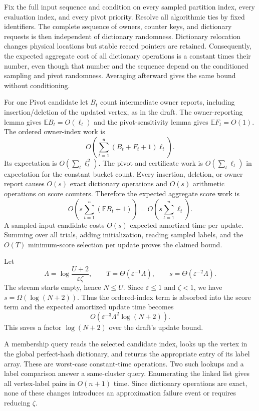 \documentclass[11pt]{article}
\begin{document}
Fix the full input sequence and condition on every sampled partition
index, every evaluation index, and every pivot priority. Resolve all
algorithmic ties by fixed identifiers. The complete sequence of owners,
counter keys, and dictionary requests is then independent of dictionary
randomness. Dictionary relocation changes physical locations but stable
record pointers are retained. Consequently, the expected aggregate cost
of all dictionary operations is a constant times their number, even
though that number and the sequence depend on the conditioned sampling
and pivot randomness. Averaging afterward gives the same bound without
conditioning.

For one Pivot candidate let $B_t$ count intermediate owner reports,
including insertion/deletion of the updated vertex, as in the draft.
The owner-reporting lemma gives
$\mathbb E B_t=O(\ell_t)$ and the pivot-sensitivity lemma gives
$\mathbb E F_t=O(1)$. The ordered owner-index work is
\[
 O\!\left(\sum_{t=1}^{u}(B_t+F_t+1)\ell_t\right).
\]
Its expectation is $O(\sum_t\ell_t^2)$. The pivot and certificate work
is $O(\sum_t\ell_t)$ in expectation for the constant bucket count.
Every insertion, deletion, or owner report causes $O(s)$ exact dictionary
operations and $O(s)$ arithmetic operations on score counters. Therefore
the expected aggregate score work is
\[
 O\!\left(s\sum_{t=1}^{u}(\mathbb E B_t+1)\right)
 =O\!\left(s\sum_{t=1}^{u}\ell_t\right).
\]
A sampled-input candidate costs $O(s)$ expected amortized time per
update. Summing over all trials, adding initialization, reading sampled
labels, and the $O(T)$ minimum-score selection per update proves the
claimed bound.

Let
\[
 \Lambda=\log\frac{U+2}{\varepsilon\zeta},\qquad
 T=\Theta(\varepsilon^{-1}\Lambda),\qquad
 s=\Theta(\varepsilon^{-2}\Lambda).
\]
The stream starts empty, hence $N\le U$. Since
$\varepsilon\le1$ and $\zeta<1$, we have
$s=\Omega(\log(N+2))$. Thus the ordered-index term is absorbed into the
score term and the expected amortized update time becomes
\[
 O\!\left(\varepsilon^{-3}\Lambda^2\log(N+2)\right).
\]
This saves a factor $\log(N+2)$ over the draft's update bound.

A membership query reads the selected candidate index, looks up the
vertex in the global perfect-hash dictionary, and returns the appropriate
entry of its label array. These are worst-case constant-time operations.
Two such lookups and a label comparison answer a same-cluster query.
Enumerating the linked list gives all vertex-label pairs in $O(n+1)$
time. Since dictionary operations are exact, none of these changes
introduces an approximation failure event or requires reducing $\zeta$.
\end{document}
